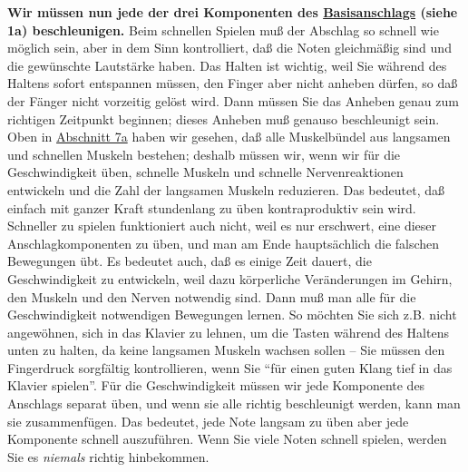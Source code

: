 \textbf{Wir müssen nun jede der drei Komponenten des \hyperref[c1iii1a1]{Basisanschlags} (siehe 1a) beschleunigen.}
Beim schnellen Spielen muß der Abschlag so schnell wie möglich sein, aber in dem Sinn kontrolliert, daß die Noten gleichmäßig sind und die gewünschte Lautstärke haben.
Das Halten ist wichtig, weil Sie während des Haltens sofort entspannen müssen, den Finger aber nicht anheben dürfen, so daß der Fänger nicht vorzeitig gelöst wird.
Dann müssen Sie das Anheben genau zum richtigen Zeitpunkt beginnen; dieses Anheben muß genauso beschleunigt sein.
Oben in \hyperref[c1iii7a]{Abschnitt 7a} haben wir gesehen, daß alle Muskelbündel aus langsamen und schnellen Muskeln bestehen; deshalb müssen wir, wenn wir für die Geschwindigkeit üben, schnelle Muskeln und schnelle Nervenreaktionen entwickeln und die Zahl der langsamen Muskeln reduzieren.
Das bedeutet, daß einfach mit ganzer Kraft stundenlang zu üben kontraproduktiv sein wird.
Schneller zu spielen funktioniert auch nicht, weil es nur erschwert, eine dieser Anschlagkomponenten zu üben, und man am Ende hauptsächlich die falschen Bewegungen übt.
Es bedeutet auch, daß es einige Zeit dauert, die Geschwindigkeit zu entwickeln, weil dazu körperliche Veränderungen im Gehirn, den Muskeln und den Nerven notwendig sind.
Dann muß man alle für die Geschwindigkeit notwendigen Bewegungen lernen.
So möchten Sie sich z.B. nicht angewöhnen, sich in das Klavier zu lehnen, um die Tasten während des Haltens unten zu halten, da keine langsamen Muskeln wachsen sollen -- Sie müssen den Fingerdruck sorgfältig kontrollieren, wenn Sie \enquote{für einen guten Klang tief in das Klavier spielen}.
Für die Geschwindigkeit müssen wir jede Komponente des Anschlags separat üben, und wenn sie alle richtig beschleunigt werden, kann man sie zusammenfügen.
Das bedeutet, jede Note langsam zu üben aber jede Komponente schnell auszuführen.
Wenn Sie viele Noten schnell spielen, werden Sie es \textit{niemals} richtig hinbekommen.

